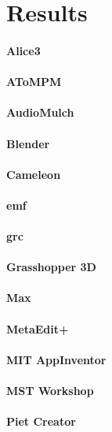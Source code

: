 \section{Results}
\label{sec:results}

\paragraph{Alice3}
\paragraph{AToMPM}
\paragraph{AudioMulch}
\paragraph{Blender}
\paragraph{Cameleon}
\paragraph{\ac{emf}}
\paragraph{\ac{grc}}
\paragraph{Grasshopper 3D }
\paragraph{Max}
\paragraph{MetaEdit+}
\paragraph{MIT AppInventor}
\paragraph{MST Workshop}
\paragraph{Piet Creator}
